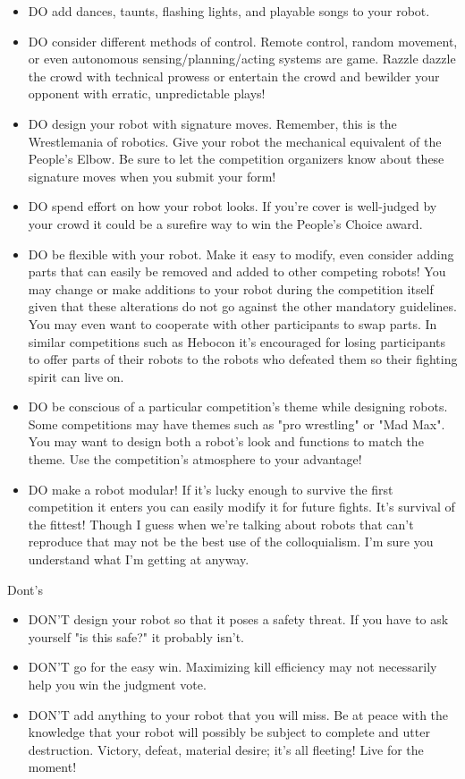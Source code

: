 \documentclass{article}
\begin{document}
	\begin{itemize}
 			\item DO add dances, taunts, flashing lights, and playable songs to your robot.
  			\item DO consider different methods of control. Remote control, random movement, or even
autonomous sensing/planning/acting systems are game. Razzle dazzle the crowd with technical prowess or entertain the crowd and bewilder your opponent with erratic, unpredictable plays!
 			\item DO design your robot with signature moves. Remember, this is the Wrestlemania of robotics. Give your robot the mechanical equivalent of the People's Elbow. Be sure to let the competition organizers know about these signature moves when you submit your form!
  			\item DO spend effort on how your robot looks. If you're cover is well-judged by your crowd it could be a surefire way to win the People's Choice award.
 			\item DO be flexible with your robot. Make it easy to modify, even consider adding parts that can easily be removed and added to other competing robots! You may change or make additions to your robot during the competition itself given that these alterations do not go against the other mandatory guidelines. You may even want to cooperate with other participants to swap parts. In similar competitions such as Hebocon it's encouraged for losing participants to offer parts of their robots to the robots who defeated them so their fighting spirit can live on.
  			\item DO be conscious of a particular competition's theme while designing robots. Some competitions may have themes such as "pro wrestling" or "Mad Max". You may want to design both a robot's look and functions to match the theme. Use the competition's atmosphere to your advantage!
 			\item DO make a robot modular! If it's lucky enough to survive the first competition it enters you can easily modify it for future fights. It's survival of the fittest! Though I guess when we're talking about robots that can't reproduce that may not be the best use of the colloquialism. I'm sure you understand what I'm getting at anyway.				
	
		\end{itemize}


	
	Dont's
				
	\begin{itemize}
  			\item DON'T design your robot so that it poses a safety threat. If you have to ask yourself "is this safe?" it probably isn't.
 			\item DON'T go for the easy win. Maximizing kill efficiency may not necessarily help you win the judgment vote.
  			\item DON'T add anything to your robot that you will miss. Be at peace with the knowledge that your robot will possibly be subject to complete and utter destruction. Victory, defeat, material desire; it's all fleeting! Live for the moment!
		\end{itemize}
\end{document}
